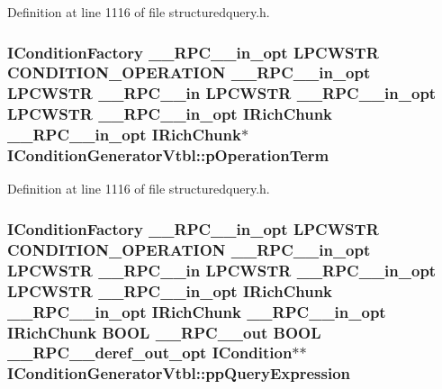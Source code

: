 Definition at line 1116 of file structuredquery.\+h.

\subsubsection[{\texorpdfstring{p\+Operation\+Term}{pOperationTerm}}]{ {\bf I\+Condition\+Factory} {\bf \+\_\+\+\_\+\+R\+P\+C\+\_\+\+\_\+in\+\_\+opt} {\bf L\+P\+C\+W\+S\+TR} {\bf C\+O\+N\+D\+I\+T\+I\+O\+N\+\_\+\+O\+P\+E\+R\+A\+T\+I\+ON} {\bf \+\_\+\+\_\+\+R\+P\+C\+\_\+\+\_\+in\+\_\+opt} {\bf L\+P\+C\+W\+S\+TR} {\bf \+\_\+\+\_\+\+R\+P\+C\+\_\+\+\_\+in} {\bf L\+P\+C\+W\+S\+TR} {\bf \+\_\+\+\_\+\+R\+P\+C\+\_\+\+\_\+in\+\_\+opt} {\bf L\+P\+C\+W\+S\+TR} {\bf \+\_\+\+\_\+\+R\+P\+C\+\_\+\+\_\+in\+\_\+opt} {\bf I\+Rich\+Chunk} {\bf \+\_\+\+\_\+\+R\+P\+C\+\_\+\+\_\+in\+\_\+opt} {\bf I\+Rich\+Chunk}$\ast$ I\+Condition\+Generator\+Vtbl\+::p\+Operation\+Term}\hypertarget{struct_i_condition_generator_vtbl_a1019d02d3bef325d87251dba7be666b8}{}\label{struct_i_condition_generator_vtbl_a1019d02d3bef325d87251dba7be666b8}


Definition at line 1116 of file structuredquery.\+h.

\subsubsection[{\texorpdfstring{pp\+Query\+Expression}{ppQueryExpression}}]{ {\bf I\+Condition\+Factory} {\bf \+\_\+\+\_\+\+R\+P\+C\+\_\+\+\_\+in\+\_\+opt} {\bf L\+P\+C\+W\+S\+TR} {\bf C\+O\+N\+D\+I\+T\+I\+O\+N\+\_\+\+O\+P\+E\+R\+A\+T\+I\+ON} {\bf \+\_\+\+\_\+\+R\+P\+C\+\_\+\+\_\+in\+\_\+opt} {\bf L\+P\+C\+W\+S\+TR} {\bf \+\_\+\+\_\+\+R\+P\+C\+\_\+\+\_\+in} {\bf L\+P\+C\+W\+S\+TR} {\bf \+\_\+\+\_\+\+R\+P\+C\+\_\+\+\_\+in\+\_\+opt} {\bf L\+P\+C\+W\+S\+TR} {\bf \+\_\+\+\_\+\+R\+P\+C\+\_\+\+\_\+in\+\_\+opt} {\bf I\+Rich\+Chunk} {\bf \+\_\+\+\_\+\+R\+P\+C\+\_\+\+\_\+in\+\_\+opt} {\bf I\+Rich\+Chunk} {\bf \+\_\+\+\_\+\+R\+P\+C\+\_\+\+\_\+in\+\_\+opt} {\bf I\+Rich\+Chunk} {\bf B\+O\+OL} {\bf \+\_\+\+\_\+\+R\+P\+C\+\_\+\+\_\+out} {\bf B\+O\+OL} {\bf \+\_\+\+\_\+\+R\+P\+C\+\_\+\+\_\+deref\+\_\+out\+\_\+opt} {\bf I\+Condition}$\ast$$\ast$ I\+Condition\+Generator\+Vtbl\+::pp\+Query\+Expression}\hypertarget{struct_i_condition_generator_vtbl_af5c9733b2324702636c31a6d5915410a}{}\label{struct_i_condition_generator_vtbl_af5c9733b2324702636c31a6d5915410a}


